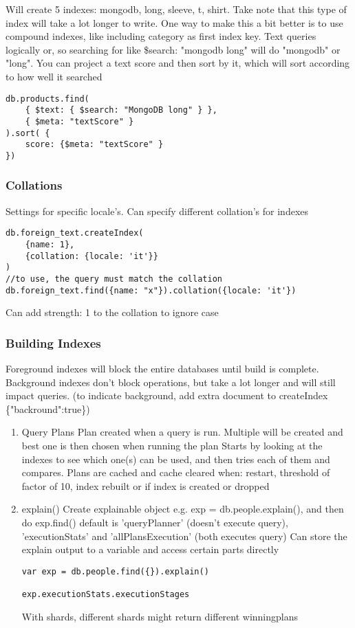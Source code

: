 \documentclass[11pt]{article}
\begin{document}
Will create 5 indexes: mongodb, long, sleeve, t, shirt.
Take note that this type of index will take a lot longer to write. One way to make this a bit better is to use compound indexes, like including category as first index key.
Text queries logically or, so searching for like \$search: "mongodb long" will do "mongodb" or "long". You can project a text score and then sort by it, which will sort according to how well it searched

\begin{verbatim}
db.products.find(
    { $text: { $search: "MongoDB long" } },
    { $meta: "textScore" }
).sort( {
    score: {$meta: "textScore" }
})
\end{verbatim}

\subsubsection{Collations}
\label{sec:org47dd081}
Settings for specific locale's. Can specify different collation's for indexes
\begin{verbatim}
db.foreign_text.createIndex(
    {name: 1},
    {collation: {locale: 'it'}}
)
//to use, the query must match the collation
db.foreign_text.find({name: "x"}).collation({locale: 'it'})
\end{verbatim}

Can add strength: 1 to the collation to ignore case

\subsubsection{Building Indexes}
\label{sec:orgd769104}
Foreground indexes will block the entire databases until build is complete.
Background indexes don't block operations, but take a lot longer and will still impact queries. (to indicate background, add extra document to createIndex \{"backround":true\})

\begin{enumerate}
\item Query Plans
\label{sec:orge6a2ba6}
Plan created when a query is run. Multiple will be created and best one is then chosen when running the plan
Starts by looking at the indexes to see which one(s) can be used, and then tries each of them and compares.
Plans are cached and cache cleared when: restart, threshold of factor of 10, index rebuilt or if index is created or dropped

\item explain()
\label{sec:org7ee7093}
Create explainable object e.g. exp = db.people.explain(), and then do exp.find()
default is 'queryPlanner' (doesn't execute query), 'executionStats' and 'allPlansExecution' (both executes query)
Can store the explain output to a variable and access certain parts directly


\begin{verbatim}
var exp = db.people.find({}).explain()

exp.executionStats.executionStages
\end{verbatim}

With shards, different shards might return different winningplans
\end{enumerate}
\end{document}
